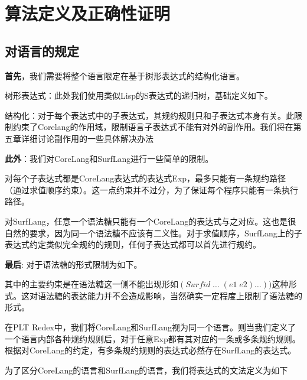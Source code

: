 \pagestyle{fancy}
\normalsize
\linespread{1.5}\selectfont
\chapter{算法定义及正确性证明}

\section{对语言的规定}
{\bfseries 首先}，我们需要将整个语言限定在基于树形表达式的结构化语言。

树形表达式：此处我们使用类似Lisp的S表达式的递归树，基础定义如下。


结构化：对于每个表达式中的子表达式，其规约规则只和子表达式本身有关。此限制约束了Corelang的作用域，限制语言子表达式不能有对外的副作用。我们将在第五章详细讨论副作用的一些具体解决办法

{\bfseries 此外}：我们对CoreLang和SurfLang进行一些简单的限制。

对每个子表达式都是CoreLang表达式的表达式Exp，最多只能有一条规约路径（通过求值顺序约束）。这一点约束并不过分，为了保证每个程序只能有一条执行路径。

对SurfLang，任意一个语法糖只能有一个CoreLang的表达式与之对应。这也是很自然的要求，因为同一个语法糖不应该有二义性。对于求值顺序，SurfLang上的子表达式约定类似完全规约的规则，任何子表达式都可以首先进行规约。

{\bfseries 最后}: 对于语法糖的形式限制为如下。

其中的主要约束是在语法糖这一侧不能出现形如$(Surfid\;\ldots\;(e1\;e2)\ldots))$这种形式。这对语法糖的表达能力并不会造成影响，当然确实一定程度上限制了语法糖的形式。

在PLT Redex中，我们将CoreLang和SurfLang视为同一个语言。则当我们定义了一个语言内部各种规约规则后，对于任意Exp都有其对应的一条或多条规约规则。根据对CoreLang的约定，有多条规约规则的表达式必然存在SurfLang的表达式。

为了区分CoreLang的语言和SurfLang的语言，我们将表达式的文法定义为如下

